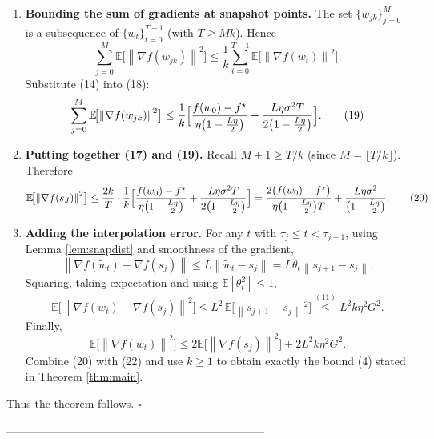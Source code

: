\documentclass{article}
\newcommand{\E}{\mathbb{E}}
\newcommand{\norm}[1]{\left\lVert #1\right\rVert}
\begin{document}
\begin{enumerate}[label=[Step \arabic*]]
    \item \textbf{Bounding the sum of gradients at snapshot points.}  
    The set $\{w_{jk}\}_{j=0}^{M}$ is a subsequence of $\{w_t\}_{t=0}^{T-1}$ (with $T\ge Mk$). Hence
    \[
        \sum_{j=0}^{M}\E\!\bigl[\norm{\nabla f(w_{jk})}^2\bigr]
        \le \frac{1}{k}\sum_{t=0}^{T-1}\E\!\bigl[\norm{\nabla f(w_t)}^2\bigr].
    \tag{18}
    \]
    Substitute (14) into (18):
    \[
        \sum_{j=0}^{M}\E\!\bigl[\norm{\nabla f(w_{jk})}^2\bigr]
        \le \frac{1}{k}\Bigl[
            \frac{f(w_0)-f^{\star}}{\eta\bigl(1-\frac{L\eta}{2}\bigr)}
            +\frac{L\eta\sigma^2 T}{2\bigl(1-\frac{L\eta}{2}\bigr)}\Bigr].
    \tag{19}
    \]

    \item \textbf{Putting together (17) and (19).}  
    Recall $M+1\ge T/k$ (since $M=\lfloor T/k\rfloor$). Therefore
    \[
        \E\!\bigl[\norm{\nabla f(s_J)}^2\bigr]
        \le \frac{2k}{T}\cdot\frac{1}{k}\Bigl[
            \frac{f(w_0)-f^{\star}}{\eta\bigl(1-\frac{L\eta}{2}\bigr)}
            +\frac{L\eta\sigma^2 T}{2\bigl(1-\frac{L\eta}{2}\bigr)}\Bigr]
        =\frac{2\bigl(f(w_0)-f^{\star}\bigr)}{\eta\bigl(1-\frac{L\eta}{2}\bigr)T}
          +\frac{L\eta\sigma^2}{\bigl(1-\frac{L\eta}{2}\bigr)} .
    \tag{20}
    \]

    \item \textbf{Adding the interpolation error.}  
    For any $t$ with $\tau_j\le t<\tau_{j+1}$,
    using Lemma \ref{lem:snapdist} and smoothness of the gradient,
    \[
        \norm{\nabla f(\widetilde w_t)-\nabla f(s_j)}\le L\norm{\widetilde w_t-s_j}
        =L\theta_t\norm{s_{j+1}-s_j}.
    \]
    Squaring, taking expectation and using $\E[\theta_t^2]\le 1$,
    \[
        \E\!\bigl[\norm{\nabla f(\widetilde w_t)-\nabla f(s_j)}^2\bigr]
        \le L^2\,\E\!\bigl[\norm{s_{j+1}-s_j}^2\bigr]
        \overset{(11)}{\le} L^2 k\eta^2 G^2 .
    \tag{21}
    \]
    Finally,
    \[
        \E\!\bigl[\norm{\nabla f(\widetilde w_t)}^2\bigr]
        \le 2\E\!\bigl[\norm{\nabla f(s_j)}^2\bigr]+2L^2k\eta^2 G^2 .
    \tag{22}
    \]
    Combine (20) with (22) and use $k\ge1$ to obtain exactly the bound (4) stated in Theorem \ref{thm:main}.

\end{enumerate}
Thus the theorem follows. $\square$

---------------------------------------------------------------------
\end{document}
